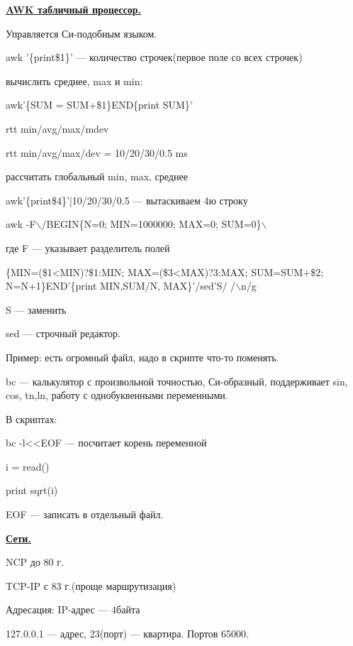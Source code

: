 \par \underline{\textbf{AWK
табличный процессор.}}
\par 
Управляется Си-подобным языком.
\par 
awk '\{print\$1\}' — количество строчек(первое
поле со всех строчек)
\par 
вычислить среднее, max и min:
\par 
awk'\{SUM = SUM+\$1\}END\{print SUM\}'
\par 
rtt min/avg/max/mdev
\par 
rtt min/avg/max/dev = 10/20/30/0.5 ms
\par 
рассчитать глобальный min, max, среднее
\par 
awk'\{print\$4\}'|10/20/30/0.5 — вытаскиваем 4ю строку
\par 
awk -F$\backslash$/BEGIN\{N=0; MIN=1000000; MAX=0; SUM=0\}$\backslash$
\par 
где F — указывает разделитель полей
\par 
\{MIN=(\$1<MIN)?\$1:MIN; MAX=(\$3<MAX)?3:MAX; SUM=SUM+\$2;
N=N+1\}END'\{print MIN,SUM/N, MAX\}'/sed'S/ /$\backslash$n/g
\par 
S — заменить
\par 
sed — строчный редактор.
\par 
Пример: есть огромный файл, надо в скрипте
что-то поменять.
\par 
bc — калькулятор с произвольной точностью,
Си-образный, поддерживает sin, cos, tn,ln,
работу с однобуквенными переменными.
\par 
В скриптах:
\par 
bc -l<<EOF — посчитает корень переменной
\par 
i = read()
\par 
print sqrt(i)
\par 
EOF — записать в отдельный файл.

\par \underline{\textbf{Сети.}}
\par 
NCP до 80 г.
\par 
TCP-IP с 83 г.(проще маршрутизация)
\par 
Адресация: IP-адрес — 4байта
\par 
127.0.0.1 — адрес, 23(порт) — квартира. Портов
65000. 

